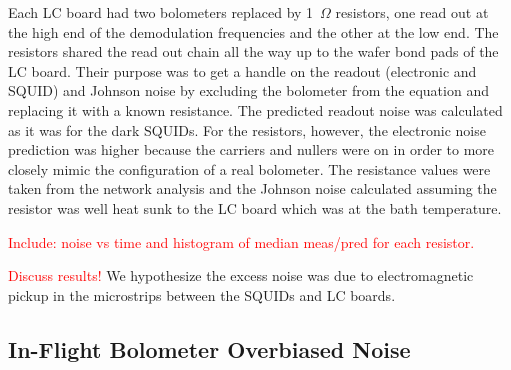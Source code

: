 Each \ac{LC} board had two bolometers replaced by 1~$\Omega$ resistors, one read out at the high end of the demodulation frequencies and the other at the low end. 
The resistors shared the read out chain all the way up to the wafer bond pads of the LC board. 
Their purpose was to get a handle on the readout (electronic and \ac{SQUID}) and Johnson noise by excluding the bolometer from the equation and replacing it with a known resistance. 
The predicted readout noise was calculated as it was for the dark \ac{SQUID}s. 
For the resistors, however, the electronic noise prediction was higher because the carriers and nullers were on in order to more closely mimic the configuration of a real bolometer. 
The resistance values were taken from the network analysis and the Johnson noise calculated assuming the resistor was well heat sunk to the \ac{LC} board which was at the bath temperature. 

\textcolor{red}{Include:
noise vs time and histogram of median meas/pred for each resistor. }

\textcolor{red}{Discuss results!}
We hypothesize the excess noise was due to electromagnetic pickup in the microstrips between the \ac{SQUID}s and \ac{LC} boards.

\subsection{In-Flight Bolometer Overbiased Noise}
\label{sec:flight_overbias_noise}


